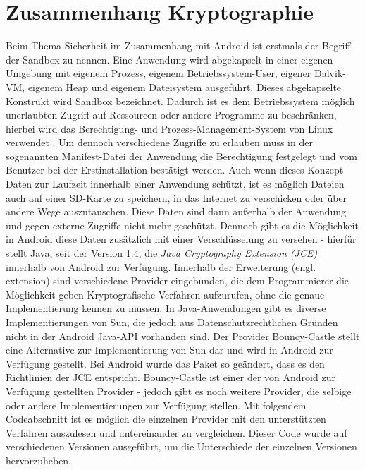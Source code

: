 \documentclass[10pt, a4paper,headsepline]{scrreprt}
\begin{document}
\section{Zusammenhang Kryptographie}
Beim Thema Sicherheit im Zusammenhang mit Android ist erstmals der Begriff der Sandbox zu nennen. Eine Anwendung wird abgekapselt in einer eigenen Umgebung mit eigenem Prozess, eigenem Betriebssystem-User, eigener Dalvik-VM, eigenem Heap und eigenem Dateisystem ausgeführt. Dieses abgekapselte Konstrukt wird Sandbox bezeichnet. Dadurch ist es dem Betriebssystem möglich unerlaubten Zugriff auf Ressourcen oder andere Programme zu beschränken, hierbei wird das Berechtigung- und Prozess-Management-System von Linux verwendet \citep[S. 33]{book:android44}.
Um dennoch verschiedene Zugriffe zu erlauben muss in der sogenannten Manifest-Datei der Anwendung die Berechtigung festgelegt und vom Benutzer bei der Erstinstallation bestätigt werden.
Auch wenn dieses Konzept Daten zur Laufzeit innerhalb einer Anwendung schützt, ist es möglich Dateien auch auf einer SD-Karte zu speichern, in das Internet zu verschicken oder über andere Wege auszutauschen. Diese Daten sind dann außerhalb der Anwendung und gegen externe Zugriffe nicht mehr geschützt.
Dennoch gibt es die Möglichkeit in Android diese Daten zusätzlich mit einer Verschlüsselung zu versehen - hierfür stellt Java, seit der Version 1.4, die \textit{Java Cryptography Extension (JCE)} innerhalb von Android zur Verfügung. Innerhalb der Erweiterung (engl. extension) sind verschiedene Provider eingebunden, die dem Programmierer die Möglichkeit geben Kryptografische Verfahren aufzurufen, ohne die genaue Implementierung kennen zu müssen. In Java-Anwendungen gibt es diverse Implementierungen von Sun, die jedoch aus Datenschutzrechtlichen Gründen nicht in der Android Java-API vorhanden sind. Der Provider Bouncy-Castle stellt eine Alternative zur Implementierung von Sun dar und wird in Android zur Verfügung gestellt. Bei Android wurde das Paket so geändert, dass es den Richtlinien der JCE entspricht. 
Bouncy-Castle ist einer der von Android zur Verfügung gestellten Provider - jedoch gibt es noch weitere Provider, die selbige oder andere Implementierungen zur Verfügung stellen. Mit folgendem Codeabschnitt ist es möglich die einzelnen Provider mit den unterstützten Verfahren auszulesen und untereinander zu vergleichen. Dieser Code wurde auf verschiedenen Versionen ausgeführt, um die Unterschiede der einzelnen Versionen hervorzuheben. \\
\end{document}

